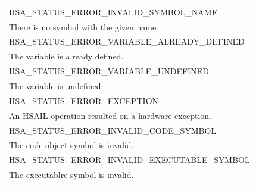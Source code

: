 \documentclass[final,oneside]{book}
\newcommand{\reftyp}[1]{#1}
\newcommand{\refenu}[1]{\reftyp{#1}}
\begin{document}
\begin{longtable}{@{\hspace{2em}}p{\linewidth-2em}}
\hspace{-2em}\refenu{HSA_\-STATUS_\-ERROR_\-INVALID_\-SYMBOL_\-NAME}\\There is no symbol with the given name.\\[2mm]
\hspace{-2em}\refenu{HSA_\-STATUS_\-ERROR_\-VARIABLE_\-ALREADY_\-DEFINED}\\The variable is already defined.\\[2mm]
\hspace{-2em}\refenu{HSA_\-STATUS_\-ERROR_\-VARIABLE_\-UNDEFINED}\\The variable is undefined.\\[2mm]
\hspace{-2em}\refenu{HSA_\-STATUS_\-ERROR_\-EXCEPTION}\\An HSAIL operation resulted on a hardware exception.\\[2mm]
\hspace{-2em}\refenu{HSA_\-STATUS_\-ERROR_\-INVALID_\-CODE_\-SYMBOL}\\The code object symbol is invalid.\\[2mm]
\hspace{-2em}\refenu{HSA_\-STATUS_\-ERROR_\-INVALID_\-EXECUTABLE_\-SYMBOL}\\The executablre symbol is invalid.
\end{longtable}
\end{document}
